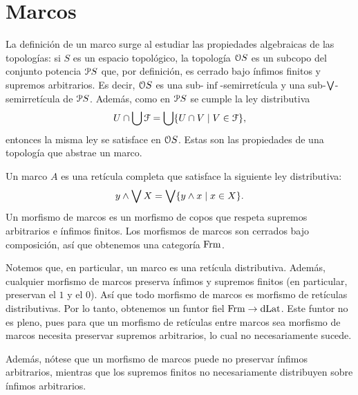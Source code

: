 \section{Marcos}\label{frm}
La definición de un marco surge al estudiar las propiedades
algebraicas de las topologías:
si $S$ es un espacio topológico, la topología $\cal OS$ es
un subcopo del conjunto potencia $\cal PS$ que,
por definición, es cerrado bajo ínfimos finitos y
supremos arbitrarios. Es decir, $\cal OS$ es una
sub-$\inf$-semirretícula y una sub-$\Sup$-semirretícula de $\cal
PS$.
Además, como en $\cal PS$ se cumple la ley distributiva
\begin{equation}
  U\cap\bigcup \cal F=\bigcup\{U\cap V\mid V\in\cal F\},
\end{equation}
entonces la misma ley se satisface en $\cal OS$.
Estas son las propiedades de una topología que abstrae un marco.

\begin{definition}
  Un marco $A$ es una retícula completa que satisface la siguiente
  ley distributiva:
  \[
      y\inf\Sup X = \Sup\{y\inf x\mid x\in X\}
  .\]
  Un morfismo de marcos es un morfismo de copos que respeta
  supremos arbitrarios e ínfimos finitos.
  Los morfismos de marcos son cerrados
  bajo composición, así que obtenemos una categoría $\Frm$.
\end{definition}

Notemos que, en particular, un marco es una retícula distributiva.
Además, cualquier morfismo de marcos preserva ínfimos y supremos
finitos (en particular, preservan el $1$ y el $0$). Así que todo
morfismo de marcos es morfismo de retículas distributivas. Por lo
tanto, obtenemos un funtor fiel $\Frm\to\DLat$. Este funtor no es
pleno, pues para que un morfismo de retículas entre marcos sea
morfismo de marcos necesita preservar supremos arbitrarios, lo cual no
necesariamente sucede.

Además, nótese que un morfismo de marcos puede no preservar ínfimos
arbitrarios, mientras que los supremos finitos no necesariamente
distribuyen sobre ínfimos arbitrarios.

